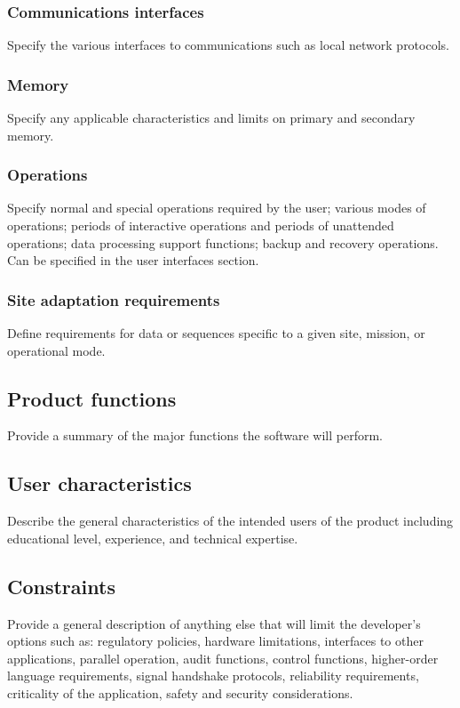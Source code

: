 \documentclass[letterpaper,10pt,draftclsnofoot,onecolumn,titlepage]{IEEEtran}
\begin{document}
	\subsubsection{Communications interfaces}
	Specify the various interfaces to communications such as local network protocols.
	
	\subsubsection{Memory}
	Specify any applicable characteristics and limits on primary and secondary memory.
	
	\subsubsection{Operations}
	Specify normal and special operations required by the user; various modes of operations; periods of interactive operations and periods of unattended operations; data processing support functions; backup and recovery operations.
	Can be specified in the user interfaces section. 
	
	\subsubsection{Site adaptation requirements}
	Define requirements for data or sequences specific to a given site, mission, or operational mode.
		
	\subsection{Product functions}
	Provide a summary of the major functions the software will perform.
	
	\subsection{User characteristics}
	Describe the general characteristics of the intended users of the product including educational level, experience, and technical expertise. 
	
	\subsection{Constraints}
	Provide a general description of anything else that will limit the developer's options such as: regulatory policies, hardware limitations, interfaces to other applications, parallel operation, audit functions, control functions, higher-order language requirements, signal handshake protocols, reliability requirements, criticality of the application, safety and security considerations.
	
\end{document}

